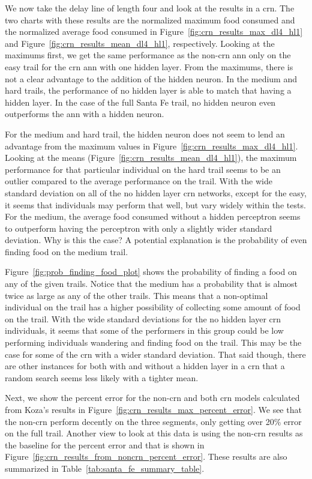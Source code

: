 We now take the delay line of length four and look at the results in a \gls{crn}. The two charts with these results are the normalized maximum food consumed and the normalized average food consumed in Figure~\ref{fig:crn_results_max_dl4_hl1} and Figure~\ref{fig:crn_results_mean_dl4_hl1}, respectively. Looking at the maximums first, we get the same performance as the non-\gls{crn} \gls{ann} only on the easy trail for the \gls{crn} \gls{ann} with one hidden layer. From the maximums, there is not a clear advantage to the addition of the hidden neuron. In the medium and hard trails, the performance of no hidden layer is able to match that having a hidden layer. In the case of the full Santa Fe trail, no hidden neuron even outperforms the \gls{ann} with a hidden neuron.

For the medium and hard trail, the hidden neuron does not seem to lend an advantage from the maximum values in Figure~\ref{fig:crn_results_max_dl4_hl1}. Looking at the means (Figure~\ref{fig:crn_results_mean_dl4_hl1}), the maximum performance for that particular individual on the hard trail seems to be an outlier compared to the average performance on the trail. With the wide standard deviation on all of the no hidden layer \gls{crn} networks, except for the easy, it seems that individuals may perform that well, but vary widely within the tests. For the medium, the average food consumed without a hidden perceptron seems to outperform having the perceptron with only a slightly wider standard deviation. Why is this the case? A potential explanation is the probability of even finding food on the medium trail.

Figure~\ref{fig:prob_finding_food_plot} shows the probability of finding a food on any of the given trails. Notice that the medium has a probability that is almost twice as large as any of the other trails. This means that a non-optimal individual on the trail has a higher possibility of collecting some amount of food on the trail. With the wide standard deviations for the no hidden layer \gls{crn} individuals, it seems that some of the performers in this group could be low performing individuals wandering and finding food on the trail. This may be the case for some of the \gls{crn} with a wider standard deviation. That said though, there are other instances for both with and without a hidden layer in a \gls{crn} that a random search seems less likely with a tighter mean.

Next, we show the percent error for the non-\gls{crn} and both \gls{crn} models calculated from Koza's results in Figure~\ref{fig:crn_results_max_percent_error}. We see that the non-\gls{crn} perform decently on the three segments, only getting over 20\% error on the full trail. Another view to look at this data is using the non-\gls{crn} results as the baseline for the percent error and that is shown in Figure~\ref{fig:crn_results_from_noncrn_percent_error}. These results are also summarized in Table~\ref{tab:santa_fe_summary_table}.

